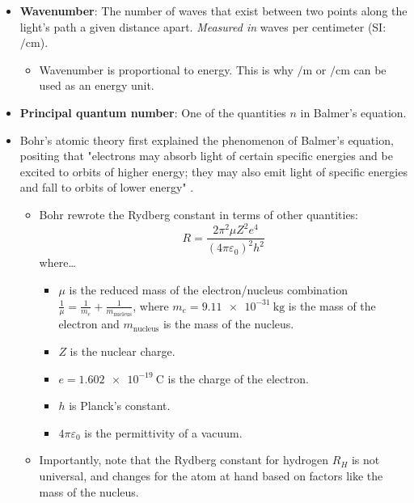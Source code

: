 \documentclass[../main.tex]{subfiles}
\begin{document}
\begin{itemize}
    \item \textbf{Wavenumber}: The number of waves that exist between two points along the light's path a given distance apart. \emph{Measured in} waves per centimeter (SI: $\si{\per\centi\meter}$).
    \begin{itemize}
        \item Wavenumber is proportional to energy. This is why $\si{\per\meter}$ or $\si{\per\centi\meter}$ can be used as an energy unit.
    \end{itemize}
    \item \textbf{Principal quantum number}: One of the quantities $n$ in Balmer's equation.
    \item Bohr's atomic theory first explained the phenomenon of Balmer's equation, positing that "electrons may absorb light of certain specific energies and be excited to orbits of higher energy; they may also emit light of specific energies and fall to orbits of lower energy" \parencite[11-12]{bib:MiesslerFischerTarr}.
    \begin{itemize}
        \item Bohr rewrote the Rydberg constant in terms of other quantities:
        \begin{equation*}
            R = \frac{2\pi^2\mu Z^2e^4}{(4\pi\varepsilon_0)^2h^2}
        \end{equation*}
        where\dots
        \begin{itemize}
            \item $\mu$ is the reduced mass of the electron/nucleus combination $\frac{1}{\mu}=\frac{1}{m_e}+\frac{1}{m_\text{nucleus}}$, where $m_e=\SI{9.11e-31}{\kilo\gram}$ is the mass of the electron and $m_\text{nucleus}$ is the mass of the nucleus.
            \item $Z$ is the nuclear charge.
            \item $e=\SI{1.602e-19}{\coulomb}$ is the charge of the electron.
            \item $h$ is Planck's constant.
            \item $4\pi\varepsilon_0$ is the permittivity of a vacuum.
        \end{itemize}
        \item Importantly, note that the Rydberg constant for hydrogen $R_H$ is not universal, and changes for the atom at hand based on factors like the mass of the nucleus.
    \end{itemize}
    \begin{figure}[h!]
        \centering
\end{figure}
\end{itemize}
\end{document}
